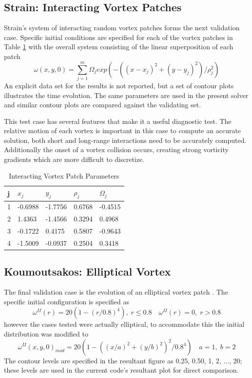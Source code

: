 \documentclass[letterpaper,12pt]{report}
\newcommand{\be}{\begin{equation}}
\newcommand{\ee}{\end{equation}}
\begin{document}
\subsection{Strain: Interacting Vortex Patches}
Strain's system of interacting random vortex patches \cite{Strain1996} forms the next validation case. Specific initial conditions are specified for each of the vortex patches in Table \ref{table:StrainTable} with the overall system consisting of the linear superposition of each patch
\be \omega(x,y,0) = \sum_{j=1}^m \Omega_j exp(-((x-x_j)^2 + (y-y_j)^2)/\rho_j^2) \ee
An explicit data set for the results is not reported, but a set of contour plots illustrates the time evolution. The same parameters are used in the present solver and similar contour plots are compared against the validating set.

This test case has several features that make it a useful diagnostic test. The relative motion of each vortex is important in this case to compute an accurate solution, both short and long-range interactions need to be accurately computed. Additionally the onset of a vortex collision occurs, creating strong vorticity gradients which are more difficult to discretize.

\begin{table}
\centering
\caption{Interacting Vortex Patch Parameters}\label{table:StrainTable}
\begin{tabular}{lllll}
\hline
j & $x_j$    & $y_j$    & $\rho_j$ & $\Omega_j$ \\ \hline
1 & -0.6988 & -1.7756 & 0.6768  & -0.4515   \\
2 & 1.4363  & -1.4566 & 0.3294  & 0.4968    \\
3 & -0.1722 & 0.4175  & 0.5807  & -0.9643   \\
4 & -1.5009 & -0.0937 & 0.2504  &  0.3418    \\ \hline
\end{tabular}
\end{table}

\subsection{Koumoutsakos: Elliptical Vortex}
The final validation case is the evolution of an elliptical vortex patch \cite{Koum1997}. The specific initial configuration is specified as
\be \omega^{II}(r) = 20(1-(r/0.8)^4), \; r\leq 0.8 \quad \omega^{II}(r)=0, \; r>0.8 \ee
however the cases tested were actually elliptical, to accommodate this the initial distribution was modified to
\be \omega^{II}(x,y,0)_{mod} = 20(1-((x/a)^2+(y/b)^2)^2/0.8^4 ) \quad a=1, \; b=2 \ee
The contour levels are specified in the resultant figure as 0.25, 0.50, 1, 2, ..., 20; these levels are used in the current code's resultant plot for direct comparison.
\end{document}
